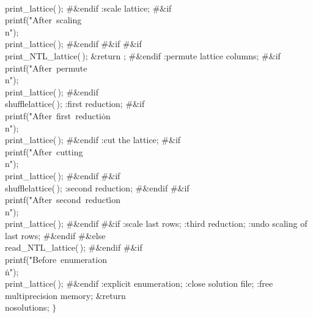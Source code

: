 \\{print\_lattice}(\,);\6
\8\#\&{endif}\6
:scale lattice\X;\6
\8\#\&{if} \6
\\{printf}(\.{"After\ scaling\\n"});\6
\\{print\_lattice}(\,);\6
\8\#\&{endif}\6
\8\#\&{if} \6
\8\#\&{if} \6
\\{print\_NTL\_lattice}(\,);\6
\&{return} ;\6
\8\#\&{endif}\6
:permute lattice columns\X;\6
\8\#\&{if} \6
\\{printf}(\.{"After\ permute\\n"});\6
\\{print\_lattice}(\,);\6
\8\#\&{endif}\6
\\{shufflelattice}(\,);\6
:first reduction\X;\6
\8\#\&{if} \6
\\{printf}(\.{"After\ first\ reducti}\)\.{on\\n"});\6
\\{print\_lattice}(\,);\6
\8\#\&{endif}\6
:cut the lattice\X;\6
\8\#\&{if} \6
\\{printf}(\.{"After\ cutting\\n"});\6
\\{print\_lattice}(\,);\6
\8\#\&{endif}\6
\8\#\&{if} \6
\\{shufflelattice}(\,);\6
:second reduction\X;\6
\8\#\&{endif}\6
\8\#\&{if} \6
\\{printf}(\.{"After\ second\ reduct}\)\.{ion\\n"});\6
\\{print\_lattice}(\,);\6
\8\#\&{endif}\6
\8\#\&{if} \6
:scale last rows\X;\6
:third reduction\X;\6
:undo scaling of last rows\X;\6
\8\#\&{endif}\6
\8\#\&{else}\6
\\{read\_NTL\_lattice}(\,);\6
\8\#\&{endif}\6
\8\#\&{if} \6
\\{printf}(\.{"Before\ enumeration\\}\)\.{n"});\6
\\{print\_lattice}(\,);\6
\8\#\&{endif}\6
:explicit enumeration\X;\6
:close solution file\X;\6
:free multiprecision memory\X;\6
\&{return} \\{nosolutions};\6
\4${}\}{}$\2\par
\fi

